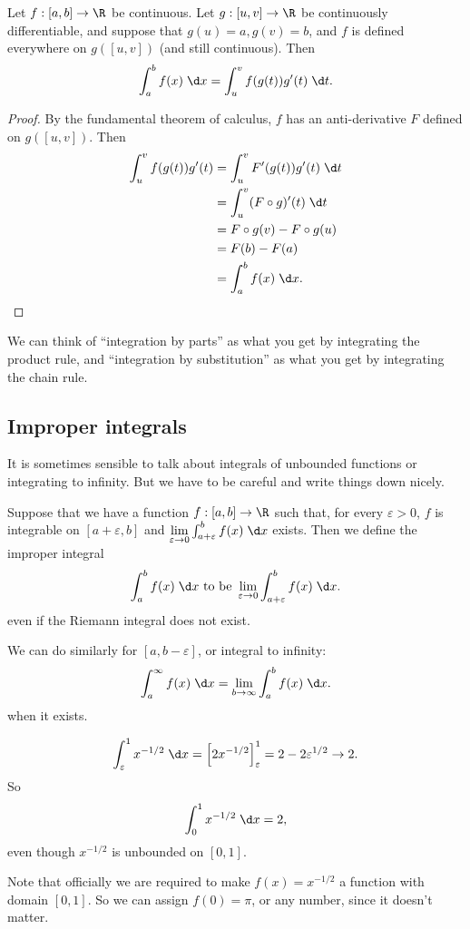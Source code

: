 \documentclass[a4paper]{article}
\begin{document}
\begin{thm}
  Let $f: [a, b] \to \R$ be continuous. Let $g: [u, v] \to \R$ be continuously differentiable, and suppose that $g(u) = a, g(v) = b$, and $f$ is defined everywhere on $g([u, v])$ (and still continuous). Then
  \[
    \int_a^b f(x)\;\d x = \int_u^v f(g(t))g'(t)\;\d t.
  \]
\end{thm}

\begin{proof}
  By the fundamental theorem of calculus, $f$ has an anti-derivative $F$ defined on $g([u, v])$. Then
  \begin{align*}
    \int_u^v f(g(t))g'(t) &= \int_u^v F'(g(t))g'(t)\;\d t \\
    &= \int_u^v (F\circ g)'(t)\;\d t \\
    &= F\circ g(v) - F\circ g(u)\\
    &= F(b) - F(a)\\
    &= \int_a^b f(x)\;\d x.
  \end{align*}
\end{proof}
We can think of ``integration by parts'' as what you get by integrating the product rule, and ``integration by substitution'' as what you get by integrating the chain rule.

\subsection{Improper integrals}
It is sometimes sensible to talk about integrals of unbounded functions or integrating to infinity. But we have to be careful and write things down nicely.

\begin{defi}
  Suppose that we have a function $f: [a, b] \to \R$ such that, for every $\varepsilon > 0$, $f$ is integrable on $[a + \varepsilon, b]$ and $\lim\limits_{\varepsilon \to 0}\int_{a + \varepsilon}^b f(x)\;\d x$ exists. Then we define the improper integral
  \[
    \int_a^bf(x)\;\d x \text{ to be } \lim_{\varepsilon \to 0}\int_{a + \varepsilon}^b f(x)\;\d x.
  \]
  even if the Riemann integral does not exist.

  We can do similarly for $[a, b - \varepsilon]$, or integral to infinity:
  \[
    \int_a^\infty f(x)\;\d x = \lim_{b \to \infty} \int_a^b f(x)\;\d x.
  \]
  when it exists.
\end{defi}
\begin{eg}
  \[
    \int_\varepsilon^1 x^{-1/2}\;\d x = \left[2x^{-1/2}\right]^1_\varepsilon = 2 - 2\varepsilon^{1/2} \to 2.
  \]
  So
  \[
    \int_0^1 x^{-1/2}\;\d x = 2,
  \]
  even though $x^{-1/2}$ is unbounded on $[0, 1]$.

  Note that officially we are required to make $f(x) = x^{-1/2}$ a function with domain $[0, 1]$. So we can assign $f(0) = \pi$, or any number, since it doesn't matter.
\end{eg}
\end{document}
